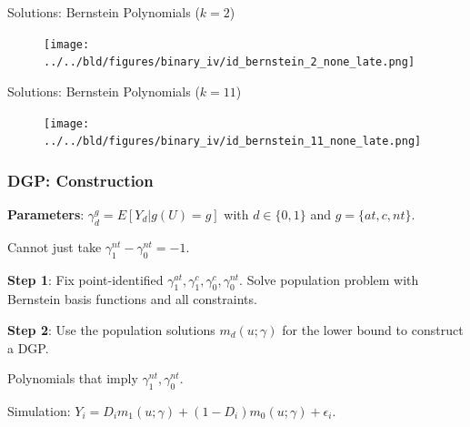 \documentclass[11pt, aspectratio=169]{beamer}
\begin{document}
\begin{frame}{Solutions: Bernstein Polynomials ($k=2$)}

    \begin{figure}
        \centering
        \texttt{[image: ../../bld/figures/binary\_iv/id\_bernstein\_2\_none\_late.png]}
    \end{figure}


\end{frame}

\begin{frame}{Solutions: Bernstein Polynomials ($k=11$)}

    \begin{figure}
        \centering
        \texttt{[image: ../../bld/figures/binary\_iv/id\_bernstein\_11\_none\_late.png]}
    \end{figure}


\end{frame}


\begin{frame}
    \frametitle{DGP\@: Construction}


    \textbf{Parameters}: $\gamma_d^g = E[Y_d|g(U)=g]$ with $d\in\{0,1\}$ and $g = \{at, c, nt\}$.

    \vspace{0.5cm}

    \footnotesize{Cannot just take $\gamma_1^{nt} - \gamma_0^{nt} = -1$.}

    \vspace{0.5cm}

    \normalsize

    \textbf{Step 1}: Fix point-identified $\gamma_1^{at}, \gamma_1^c, \gamma_0^c, \gamma_0^{nt}$. Solve population problem with Bernstein basis functions and all constraints.

    \vspace{0.5cm}

    \textbf{Step 2}: Use the population solutions $m_d(u;\gamma)$ for the lower bound to construct a DGP\@.

    \vspace{0.5cm}

    \footnotesize{Polynomials that imply $\gamma_1^{nt}, \gamma_0^{nt}$.}

    \vspace{0.5cm}
    \normalsize

    Simulation: $Y_i = D_i m_1(u;\gamma) + (1-D_i)m_0(u;\gamma) + \epsilon_i$.

\end{frame}
\end{document}
